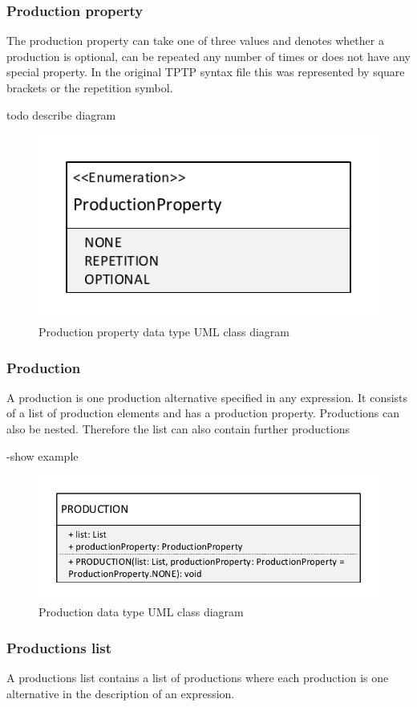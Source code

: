 \subsubsection{Production property}
The production property can take one of three values and denotes whether a production is optional, can be repeated any number of times or does not have any special property.
In the original \ac{TPTP} syntax file this was represented by square brackets or the repetition symbol.

todo describe diagram
\begin{figure}[H]
\centering
\includegraphics[width=.4\textwidth]{images/Concept_uml_data_types_production_property.pdf}
\caption{Production property data type UML class diagram}
\label{fig:ConceptProductionPropertyClassDiagram}
\end{figure}

\subsubsection{Production}
A production is one production alternative specified in any expression.
It consists of a list of production elements and has a production property. Productions can also be nested.
Therefore the list can also contain further productions

-show example
\begin{figure}[H]
\centering
\includegraphics[width=.5\textwidth]{images/Concept_uml_data_types_production.pdf}
\caption{Production data type UML class diagram}
\label{fig:ConceptSymbolsClassDiagram}
\end{figure}

\subsubsection{Productions list}
A productions list contains a list of productions where each production is one alternative in the description of an expression.


